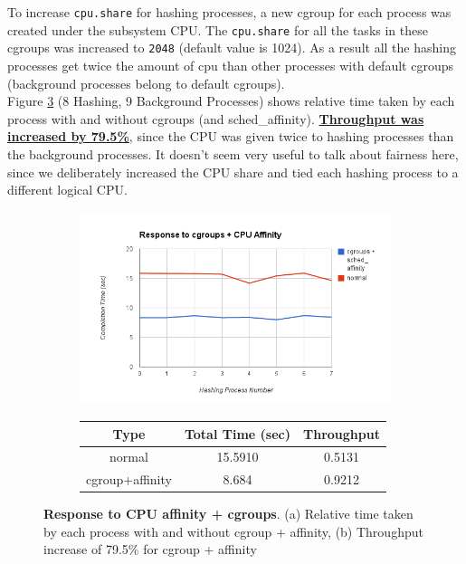 \documentclass[10pt] {article}
\begin{document}
\noindent To increase \texttt{cpu.share} for hashing processes, a new cgroup for each process was created under the subsystem CPU. The \texttt{cpu.share} for all the tasks in these cgroups was increased to \texttt{2048} (default value is 1024). As a result all the hashing processes get twice the amount of cpu than other processes with default cgroups (background processes belong to default cgroups). \\

\noindent Figure \ref{fig:cgrp} (8 Hashing, 9 Background Processes) shows relative time taken by each process with and without cgroups (and sched\_affinity). \textbf{\underline{Throughput  was increased by 79.5\%}}, since the CPU was given twice to hashing processes than the background processes. It doesn't seem very useful to talk about fairness here, since we deliberately increased the CPU share and tied each hashing process to a different logical CPU.

\begin{figure}[ht!]
\centering
\begin{subfigure}{.5\textwidth}
  \centering
  \includegraphics[width=\linewidth]{cgroup_affinity_8_9.png}
  \caption{}
  \label{fig:sub1}
\end{subfigure}%
\begin{subfigure}{.5\textwidth}
\centering

\begin{tabular}{ |c|c|c| } 
\hline
\textbf{Type} & \textbf{Total Time (sec)} & \textbf{Throughput} \\
\hline
normal & 15.5910 & 0.5131\\ 
\hline
cgroup+affinity &  8.684 & 0.9212 \\
\hline
\end{tabular}
\caption{}
\label{table:caff}
  \label{fig:sub2}
\end{subfigure}
\caption{\textbf{Response to CPU affinity + cgroups}. (a) Relative time taken by each process with and without cgroup + affinity, (b) Throughput increase of 79.5\% for cgroup + affinity}
\label{fig:cgrp}
\end{figure}
\end{document}
